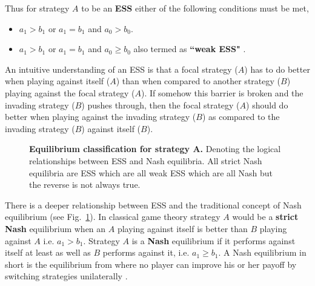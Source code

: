 \documentclass[oneside,11pt,a4paper]{book}
\begin{document}
%
Thus for strategy $A$ to be an \textbf{ESS} either of the following conditions must be met,
%
\begin{itemize}
\item $a_1 > b_1$ or $a_1 = b_1$ and $a_0 > b_0$.
\item $a_1 > b_1$ or $a_1 = b_1$ and $a_0 \geq b_0$ also termed as \textbf{``weak ESS"} \citep{thomas:1984aa,thomas:1985aa}.
\end{itemize}
%
An intuitive understanding of an ESS is that a focal strategy ($A$) has to do better when playing against itself ($A$) than when compared to another strategy ($B$) playing against the focal strategy ($A$).
If somehow this barrier is broken and the invading strategy ($B$) pushes through, then the focal strategy ($A$) should do better when playing against the invading strategy ($B$) as compared to the invading strategy ($B$) against itself ($B$).
%
\begin{figure}[h]
  \begin{center}
    \caption{\textbf{Equilibrium classification for strategy $\mathbf{A}$.}
    \small{Denoting the logical relationships between ESS and Nash equilibria.
    All strict Nash equilibria are ESS which are all weak ESS which are all Nash but the reverse is not always true.}
    }
    \label{fig:essnash}
  \end{center}
\end{figure}
%

There is a deeper relationship between ESS and the traditional concept of Nash equilibrium \citep{nash:1950ef} (see Fig.\ \ref{fig:essnash}).
In classical game theory strategy $A$ would be a \textbf{strict Nash} equilibrium when an $A$ playing against itself is better than $B$ playing against $A$ i.e. $a_1 > b_1$.
Strategy $A$ is a \textbf{Nash} equilibrium if it performs against itself at least as well as $B$ performs against it, i.e. $a_1 \geq b_1$.
A Nash equilibrium in short is the equilibrium from where no player can improve his or her payoff by switching strategies unilaterally \citep{nash:1950ef}.
\end{document}
